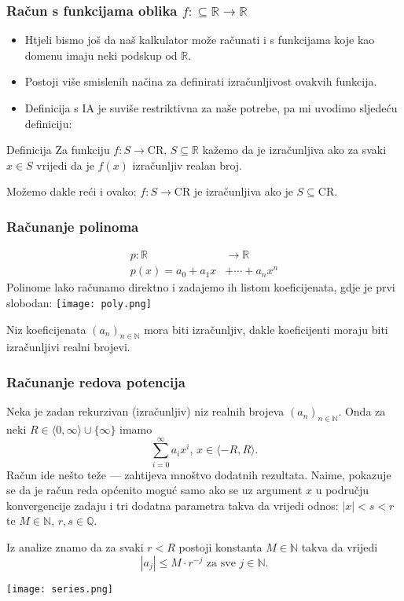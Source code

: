 \documentclass{beamer}
\def\N{\mathbb{N}}
\def\Q{\mathbb{Q}}
\def\R{\mathbb{R}}
\def\CR{\mathrm{CR}}
\begin{document}
\begin{frame}
    \frametitle{Račun s funkcijama oblika $f:\subseteq\R\to\R$}
    \begin{itemize}
        \item Htjeli bismo još da naš kalkulator može računati i s funkcijama koje kao domenu imaju neki podskup od $\R$.
        \pause
        \item Postoji više smislenih načina za definirati izračunljivost ovakvih funkcija.
        \pause
        \item Definicija s IA je suviše restriktivna za naše potrebe, pa mi uvodimo sljedeću definiciju:
    \end{itemize}
    \begin{block}{Definicija}
        Za funkciju $f:S\to\CR,\,S\subseteq\R$ kažemo da je izračunljiva ako za svaki $x\in S$ vrijedi da je
        $f(x)$ izračunljiv realan broj.
    \end{block}
    Možemo dakle reći i ovako: $f:S\to\CR$ je izračunljiva ako je $S\subseteq\CR$.
\end{frame}
\begin{frame}
    \frametitle{Računanje polinoma}
    \begin{align*}
        p:\R&\to\R \\
        p(x)=a_0+a_1x&+\dotsb+a_nx^n
    \end{align*}    
    Polinome lako računamo direktno i zadajemo ih listom koeficijenata, gdje je prvi slobodan:
    \texttt{[image: poly.png]}
    
    Niz koeficijenata $(a_n)_{n\in\N}$ mora biti izračunljiv, dakle koeficijenti moraju biti izračunljivi realni brojevi.
\end{frame}
\begin{frame}
    \frametitle{Računanje redova potencija}
    Neka je zadan rekurzivan (izračunljiv) niz realnih brojeva $(a_n)_{n\in\N}$. Onda za neki $R\in\langle 0,\infty\rangle\cup\{\infty\}$ imamo
    \begin{equation*}
        \sum^{\infty}_{i=0}a_ix^i,\,x\in\langle -R,R\rangle.
    \end{equation*}
    \pause
    Račun ide nešto teže --- zahtijeva mnoštvo dodatnih rezultata. Naime, pokazuje se da je račun reda općenito moguć samo ako se uz argument $x$ u području
    konvergencije zadaju i tri dodatna parametra takva da vrijedi odnos: $|x|<s<r$ te $M\in\N$, $r,s\in\Q$.
    \pause
    
    Iz analize znamo da za svaki $r<R$ postoji konstanta $M\in\N$ takva da vrijedi
    \begin{equation*}
        |a_j|\leq M\cdot r^{-j}\text{ za sve }j\in\N.
    \end{equation*}\cite{weihrauch}
\end{frame}
\begin{frame}
    \texttt{[image: series.png]}
\end{frame}
\end{document}
